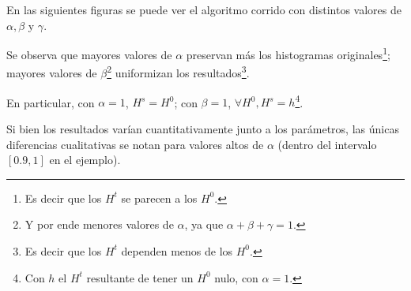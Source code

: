 \par En las siguientes figuras se puede ver el algoritmo corrido con distintos valores de $\alpha, \beta$ y $\gamma$.

\par Se observa que mayores valores de $\alpha$ preservan más los histogramas originales\footnote{Es decir que los $H^t$ se parecen a los $H^0$.};
mayores valores de $\beta$\footnote{Y por ende menores valores de $\alpha$, ya que $\alpha + \beta + \gamma = 1$.} uniformizan los resultados\footnote{Es decir que los $H^t$ dependen menos de los $H^0$.}.

\par En particular, con $\alpha = 1$, $H^s = H^0$; con $\beta = 1$, $\forall H^0, H^s = h$\footnote{Con $h$ el $H^t$ resultante de tener un $H^0$ nulo, con $\alpha = 1$.}.

\par Si bien los resultados varían cuantitativamente junto a los parámetros, las únicas diferencias cualitativas se notan para valores altos de $\alpha$ (dentro del intervalo $[0.9, 1]$ en el ejemplo).

